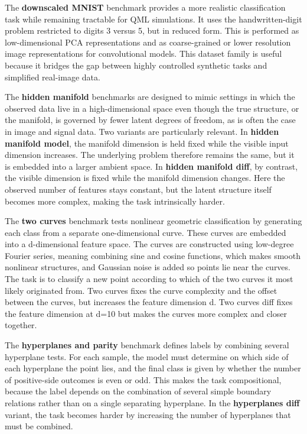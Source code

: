 \documentclass[12pt,a4paper,openany]{report}
\begin{document}
The \textbf{downscaled MNIST} benchmark provides a more realistic classification task while remaining tractable for QML simulations. It uses the handwritten-digit problem restricted to digits 3 versus 5, but in reduced form. This is performed as low-dimensional PCA representations and as coarse-grained or lower resolution image representations for convolutional models. This dataset family is useful because it bridges the gap between highly controlled synthetic tasks and simplified real-image data.

The \textbf{hidden manifold} benchmarks are designed to mimic settings in which the observed data live in a high-dimensional space even though the true structure, or the manifold, is governed by fewer latent degrees of freedom, as is often the case in image and signal data. Two variants are particularly relevant. In \textbf{hidden manifold model}, the manifold dimension is held fixed while the visible input dimension increases. The underlying problem therefore remains the same, but it is embedded into a larger ambient space. In \textbf{hidden manifold diff}, by contrast, the visible dimension is fixed while the manifold dimension changes. Here the observed number of features stays constant, but the latent structure itself becomes more complex, making the task intrinsically harder.

The \textbf{two curves} benchmark tests nonlinear geometric classification by generating each class from a separate one-dimensional curve. These curves are embedded into a d-dimensional feature space. The curves are constructed using low-degree Fourier series, meaning combining sine and cosine functions, which makes smooth nonlinear structures, and Gaussian noise is added so points lie near the curves. The task is to classify a new point according to which of the two curves it most likely originated from. Two curves fixes the curve complexity and the offset between the curves, but increases the feature dimension d. Two curves diff fixes the feature dimension at d=10 but makes the curves more complex and closer together.

The \textbf{hyperplanes and parity} benchmark defines labels by combining several hyperplane tests. For each sample, the model must determine on which side of each hyperplane the point lies, and the final class is given by whether the number of positive-side outcomes is even or odd. This makes the task compositional, because the label depends on the combination of several simple boundary relations rather than on a single separating hyperplane. In the \textbf{hyperplanes diff} variant, the task becomes harder by increasing the number of hyperplanes that must be combined.
\end{document}
